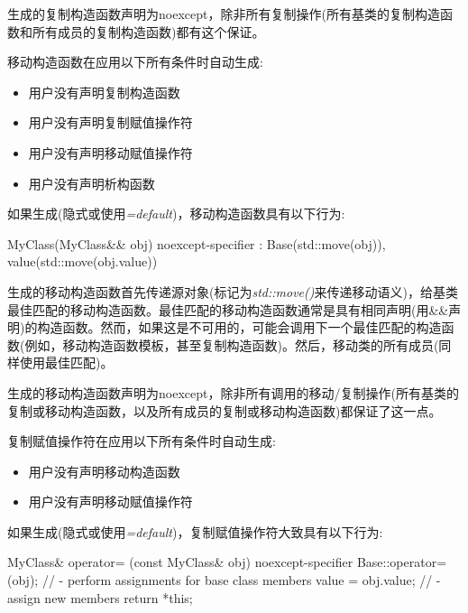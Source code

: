 生成的复制构造函数声明为noexcept，除非所有复制操作(所有基类的复制构造函数和所有成员的复制构造函数)都有这个保证。\par


移动构造函数在应用以下所有条件时自动生成:\par

\begin{itemize}
  \item 用户没有声明复制构造函数
  \item 用户没有声明复制赋值操作符
  \item 用户没有声明移动赋值操作符
  \item 用户没有声明析构函数
\end{itemize}

如果生成(隐式或使用\textit{=default})，移动构造函数具有以下行为:\par

\begin{codebox}[cpp]
MyClass(MyClass&& obj) noexcept-specifier
: Base(std::move(obj)), value(std::move(obj.value)) {
}
\end{codebox}

生成的移动构造函数首先传递源对象(标记为\textit{std::move()}来传递移动语义)，给基类最佳匹配的移动构造函数。最佳匹配的移动构造函数通常是具有相同声明(用\&\&声明)的构造函数。然而，如果这是不可用的，可能会调用下一个最佳匹配的构造函数(例如，移动构造函数模板，甚至复制构造函数)。然后，移动类的所有成员(同样使用最佳匹配)。\par

生成的移动构造函数声明为noexcept，除非所有调用的移动/复制操作(所有基类的复制或移动构造函数，以及所有成员的复制或移动构造函数)都保证了这一点。\par


复制赋值操作符在应用以下所有条件时自动生成:\par

\begin{itemize}
  \item 用户没有声明移动构造函数
  \item 用户没有声明移动赋值操作符
\end{itemize}

如果生成(隐式或使用\textit{=default})，复制赋值操作符大致具有以下行为:

\begin{codebox}[cpp]
MyClass& operator= (const MyClass& obj) noexcept-specifier {
  Base::operator=(obj); // - perform assignments for base class members
  value = obj.value; // - assign new members
  return *this;
}
\end{codebox}

